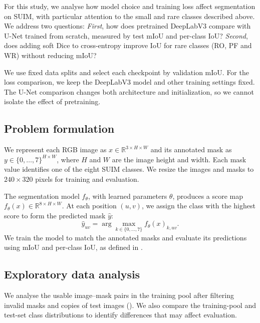 \label{sec:proposal}
For this study, we analyse how model choice and training loss affect
segmentation on SUIM, with particular attention to the small and rare classes
described above. We address two questions: \textit{First}, how does pretrained
DeepLabV3 compare with U-Net trained from scratch, measured by test mIoU and
per-class IoU? \textit{Second}, does adding soft Dice to cross-entropy improve
IoU for rare classes (RO, PF and WR) without reducing mIoU?

We use fixed data splits and select each checkpoint by validation mIoU. For the
loss comparison, we keep the DeepLabV3 model and other training settings fixed.
The U-Net comparison changes both architecture and initialization, so we cannot
isolate the effect of pretraining.

\subsection{Problem formulation}
\label{sec:formulation}
We represent each RGB image as $x\in\mathbb{R}^{3\times H\times W}$ and its
annotated mask as $y\in\{0,\ldots,7\}^{H\times W}$, where $H$ and $W$ are the
image height and width. Each mask value identifies one of the eight SUIM
classes. We resize the images and masks to $240\times320$ pixels for training
and evaluation.

The segmentation model $f_\theta$, with learned parameters $\theta$, produces
a score map $f_\theta(x)\in\mathbb{R}^{8\times H\times W}$. At each position
$(u,v)$, we assign the class with the highest score to form the predicted mask
$\hat y$:
\begin{equation}
\hat y_{uv}=\arg\max_{k\in\{0,\ldots,7\}} f_\theta(x)_{k,uv}.
\end{equation}
We train the model to match the annotated masks and evaluate its predictions
using mIoU and per-class IoU, as defined in .

\subsection{Exploratory data analysis}
\label{sec:eda}
We analyse the \suimTrainValUsable{} usable image--mask pairs in the training
pool after filtering invalid masks and copies of test images
(). We also compare the training-pool and test-set class
distributions to identify differences that may affect evaluation.

